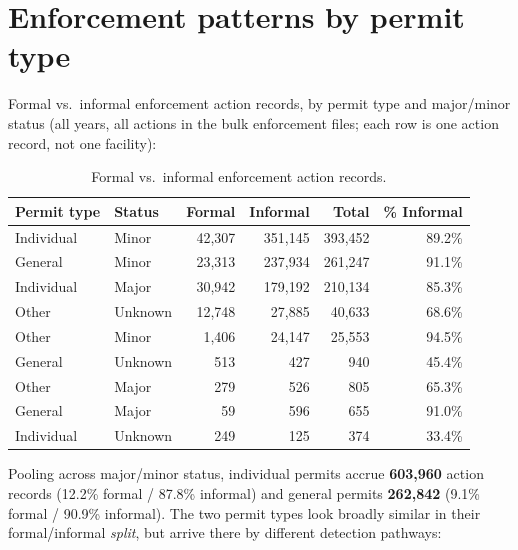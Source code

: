 \documentclass[11pt]{article}
\begin{document}
\section{Enforcement patterns by permit type}

Formal vs.\ informal enforcement action records, by permit type and major/minor
status (all years, all actions in the bulk enforcement files; each row is one
action record, not one facility):

\begin{table}[h]
\centering
\footnotesize
\caption{Formal vs.\ informal enforcement action records.}\label{tab:enforcement}
\begin{tabular}{l l r r r r}
\toprule
Permit type & Status & Formal & Informal & Total & \% Informal \\
\midrule
Individual & Minor & 42,307 & 351,145 & 393,452 & 89.2\% \\
General & Minor & 23,313 & 237,934 & 261,247 & 91.1\% \\
Individual & Major & 30,942 & 179,192 & 210,134 & 85.3\% \\
Other & Unknown & 12,748 & 27,885 & 40,633 & 68.6\% \\
Other & Minor & 1,406 & 24,147 & 25,553 & 94.5\% \\
General & Unknown & 513 & 427 & 940 & 45.4\% \\
Other & Major & 279 & 526 & 805 & 65.3\% \\
General & Major & 59 & 596 & 655 & 91.0\% \\
Individual & Unknown & 249 & 125 & 374 & 33.4\% \\
\bottomrule
\end{tabular}
\end{table}

Pooling across major/minor status, individual permits accrue \textbf{603,960}
action records (12.2\% formal / 87.8\% informal) and general permits
\textbf{262,842} (9.1\% formal / 90.9\% informal). The two permit types look
broadly similar in their formal/informal \textit{split}, but arrive there by
different detection pathways:
\end{document}
